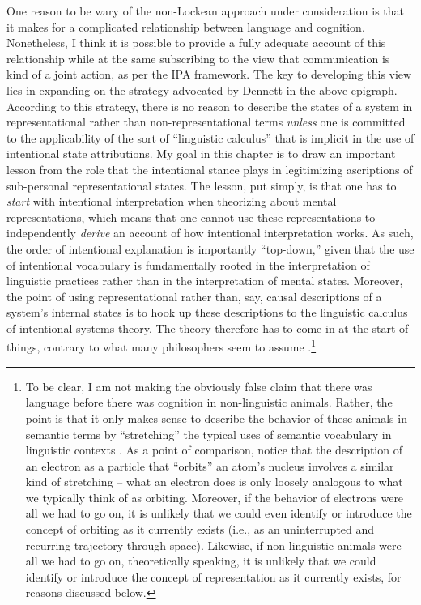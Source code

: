 One reason to be wary of the non-Lockean approach under consideration is that it makes for a complicated relationship between language and cognition. Nonetheless, I think it is possible to provide a fully adequate account of this relationship while at the same subscribing to the view that communication is kind of a joint action, as per the IPA framework. The key to developing this view lies in expanding on the strategy advocated by Dennett in the above epigraph. According to this strategy, there is no reason to describe the states of a system in representational rather than non-representational terms \textit{unless} one is committed to the applicability of the sort of ``linguistic calculus'' that is implicit in the use of intentional state attributions. My goal in this chapter is to draw an important lesson from the role that the intentional stance plays in legitimizing ascriptions of sub-personal representational states. The lesson, put simply, is that one has to \textit{start} with intentional interpretation when theorizing about mental representations, which means that one cannot use these representations to independently \textit{derive} an account of how intentional interpretation works. As such, the order of intentional explanation is importantly ``top-down,'' given that the use of intentional vocabulary is fundamentally rooted in the interpretation of linguistic practices rather than in the interpretation of mental states. Moreover, the point of using representational rather than, say, causal descriptions of a system's internal states is to hook up these descriptions to the linguistic calculus of intentional systems theory. The theory therefore has to come in at the start of things, contrary to what many philosophers seem to assume \citep[e.g.,][]{Millikan:1989,Fodor:1998,Dretske:1986}.\footnote{To be clear, I am not making the obviously false claim that there was language before there was cognition in non-linguistic animals. Rather, the point is that it only makes sense to describe the behavior of these animals in semantic terms by ``stretching'' the typical uses of semantic vocabulary in linguistic contexts \citep[][p. 59]{Dennett:2010}. As a point of comparison, notice that the description of an electron as a particle that ``orbits'' an atom's nucleus involves a similar kind of stretching -- what an electron does is only loosely analogous to what we typically think of as orbiting. Moreover, if the behavior of electrons were all we had to go on, it is unlikely that we could even identify or introduce the concept of orbiting as it currently exists (i.e., as an uninterrupted and recurring trajectory through space). Likewise, if non-linguistic animals were all we had to go on, theoretically speaking, it is unlikely that we could identify or introduce the concept of representation as it currently exists, for reasons discussed below.} 

